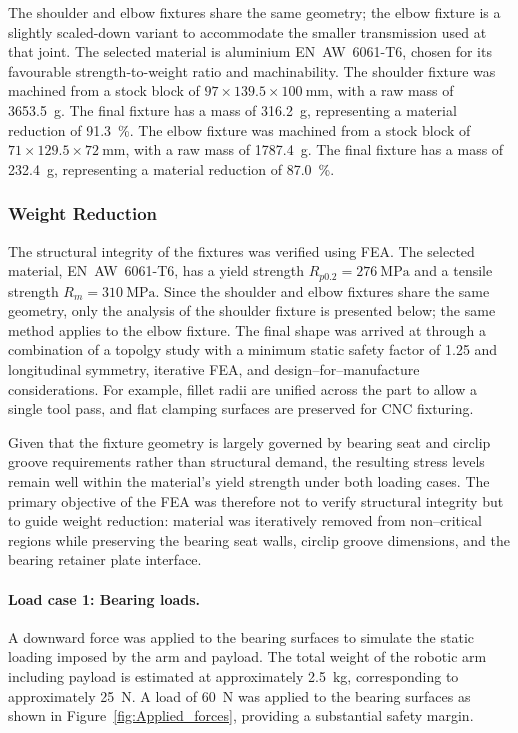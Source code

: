 \documentclass[11pt,a4paper,twoside,openright]{book}
\begin{document}
The shoulder and elbow fixtures share the same geometry; the elbow fixture is a slightly scaled-down variant to accommodate the smaller transmission used at that joint. The selected material is aluminium EN~AW~6061-T6, chosen for its favourable strength-to-weight ratio and machinability. The shoulder fixture was machined from a stock block of $97 \times 139.5 \times \SI{100}{\milli\metre}$, with a raw mass of \SI{3653.5}{\gram}. The final fixture has a mass of \SI{316.2}{\gram}, representing a material reduction of \SI{91.3}{\percent}. The elbow fixture was machined from a stock block of $71 \times 129.5 \times \SI{72}{\milli\metre}$, with a raw mass of \SI{1787.4}{\gram}. The final fixture has a mass of \SI{232.4}{\gram}, representing a material reduction of \SI{87.0}{\percent}.

\newpage

\subsubsection{Weight Reduction}

The structural integrity of the fixtures was verified using FEA. The selected material, EN~AW~6061-T6, has a yield strength $R_{p0.2} = \SI{276}{\mega\pascal}$ and a tensile strength $R_m = \SI{310}{\mega\pascal}$. Since the shoulder and elbow fixtures share the same geometry, only the analysis of the shoulder fixture is presented below; the same method applies to the elbow fixture. The final shape was arrived at through a combination of a topolgy study with a minimum static safety factor of 1.25 and longitudinal symmetry, iterative FEA, and design--for--manufacture considerations. For example, fillet radii are unified across the part to allow a single tool pass, and flat clamping surfaces are preserved for CNC fixturing.

Given that the fixture geometry is largely governed by bearing seat and circlip groove requirements rather than structural demand, the resulting stress levels remain well within the material's yield strength under both loading cases. The primary objective of the FEA was therefore not to verify structural integrity but to guide weight reduction: material was iteratively removed from non--critical regions while preserving the bearing seat walls, circlip groove dimensions, and the bearing retainer plate interface.

\paragraph{Load case 1: Bearing loads.}
A downward force was applied to the bearing surfaces to simulate the static loading imposed by the arm and payload. The total weight of the robotic arm including payload is estimated at approximately \SI{2.5}{\kilogram}, corresponding to approximately \SI{25}{\newton}. A load of \SI{60}{\newton} was applied to the bearing surfaces as shown in Figure~\ref{fig:Applied_forces}, providing a substantial safety margin.
\end{document}

